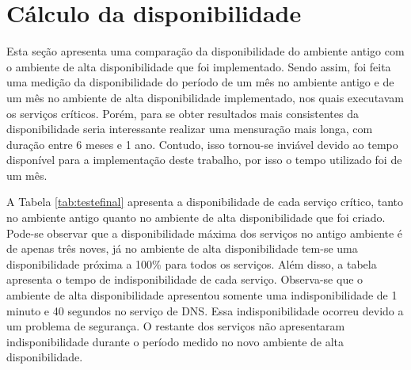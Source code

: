 \section{Cálculo da disponibilidade}
\label{section:comparacaofinal}

Esta seção apresenta uma comparação da disponibilidade do ambiente antigo com o ambiente de alta disponibilidade que foi implementado. 
Sendo assim, foi feita uma medição da disponibilidade do período de um mês no ambiente antigo e de um mês no ambiente de alta disponibilidade 
implementado, nos quais executavam os serviços críticos. Porém, para se obter resultados mais consistentes da disponibilidade seria interessante 
realizar uma mensuração mais longa, com duração entre 6 meses e 1 ano. Contudo, isso tornou-se inviável devido ao tempo disponível para a 
implementação deste trabalho, por isso o tempo utilizado foi de um mês. 

A Tabela \ref{tab:testefinal} apresenta a disponibilidade de cada serviço crítico, tanto no ambiente antigo quanto 
no ambiente de alta disponibilidade que foi criado. Pode-se observar que a disponibilidade máxima dos serviços no antigo ambiente é de apenas 
três noves, já no ambiente de alta disponibilidade tem-se uma disponibilidade próxima a 100\% para todos os serviços.
Além disso, a tabela apresenta o tempo de indisponibilidade de cada serviço. Observa-se que o ambiente de alta disponibilidade apresentou
somente uma indisponibilidade de 1 minuto e 40 segundos no serviço de \ac{DNS}. Essa indisponibilidade ocorreu devido a um problema de segurança.
O restante dos serviços não apresentaram indisponibilidade durante o período medido no novo ambiente de alta disponibilidade.

